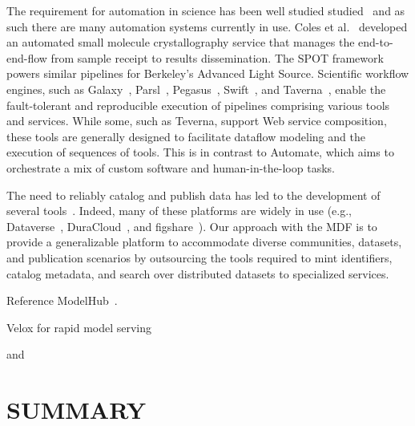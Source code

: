 \documentclass{aip-cp}
\newcommand\ian[1]{}
\newcommand\ryan[1]{}
\newcommand\ian[1]{{\color{red}[Ian: #1]}}
\newcommand\ryan[1]{{\color{green}[Ryan: #1]}}
\begin{document}
\ryan{Might need something about outsourcing.}

The requirement for automation in science has been well studied
studied~\cite{king2009automation, deslippe2014workflow, chard2017ripple} and 
as such there are many automation systems currently in use. Coles et 
al.~\cite{coles2005ecses,coles2006science} developed an automated small molecule crystallography 
service that manages the end-to-end-flow from sample receipt to results dissemination. 
The SPOT framework~\cite{deslippe2014workflow} powers similar pipelines for Berkeley's Advanced 
Light Source. Scientific workflow engines, such as Galaxy~\cite{galaxy}, Parsl~\cite{parsl}, 
Pegasus~\cite{pegasus}, Swift~\cite{wilde2011swift}, and Taverna~\cite{hull2006taverna},
enable the fault-tolerant and reproducible execution of pipelines comprising various tools and 
services. While some, such as Teverna, support Web service composition, these tools are generally 
designed to facilitate dataflow modeling and the execution of sequences of tools. This is in 
contrast to Automate, which aims to orchestrate a mix of custom software and human-in-the-loop 
tasks.

\ian{PNNL work~\cite{thomas2015towards}. Helmholtz work~\cite{gehrke2015high}.}

The need to reliably catalog and publish data has led to the development of several 
tools~\cite{chard15publication,wilkinson16,costello09pub}. Indeed, many of these platforms are 
widely in use (e.g., Dataverse~\cite{dataverse}, DuraCloud~\cite{duracloud}, and 
figshare~\cite{figshare}).
Our approach 
with the MDF is to provide a generalizable platform to accommodate diverse communities, datasets, 
and publication scenarios by outsourcing the tools required to mint identifiers, catalog metadata, 
and search over distributed datasets to specialized services.

Reference ModelHub~\cite{miao2017towards}. 


Velox for rapid model serving~\cite{crankshaw2014missing}

and~\cite{kumar2017data}



\section{SUMMARY}
\end{document}
